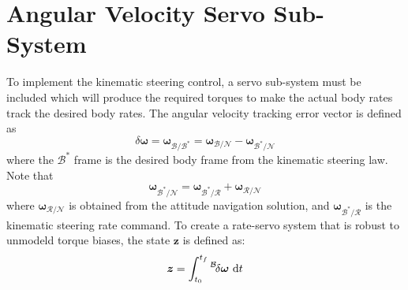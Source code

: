 \documentclass[]{BasiliskReportMemo}
\begin{document}
\section{Angular Velocity Servo Sub-System}
To implement the kinematic steering control, a servo sub-system must be included which will produce the required torques to make the actual body rates track the desired body rates.  The angular velocity tracking error vector is defined as
\begin{equation}
	\label{eq:MS:32}
	\delta \bm \omega = \bm\omega_{\mathcal{B}/\mathcal{B}^{\ast}} = \bm\omega_{\mathcal{B}/\mathcal{N}} - \bm\omega_{\mathcal{B}^{\ast}/\mathcal{N}}
\end{equation}
where the $\mathcal{B}^{\ast}$ frame is the desired body frame from the kinematic steering law.  Note that
\begin{equation}
	 \bm\omega_{\mathcal{B}^{\ast}/\mathcal{N}} =  \bm\omega_{\mathcal{B}^{\ast}/\mathcal{R}} +  \bm\omega_{\mathcal{R}/\mathcal{N}}
\end{equation}
where $\bm\omega_{\mathcal{R}/\mathcal{N}}$ is obtained from the attitude navigation solution, and $ \bm\omega_{\mathcal{B}^{\ast}/\mathcal{R}}$ is the kinematic steering rate command.  To create a rate-servo system that is robust to unmodeld torque biases, the state $\bm z$ is defined as:
\begin{equation}
	\label{eq:MS:34}
	\bm z = \int_{t_{0}}^{t_{f}} \leftexp{B}{ \delta\bm\omega}\ \D t
\end{equation}
\end{document}
